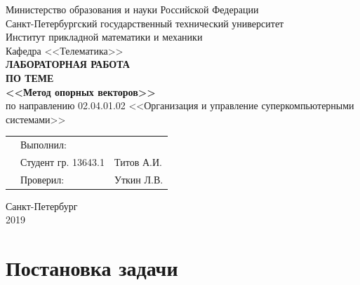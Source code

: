 \documentclass[]{article}
\numberwithin{equation}{section}
\begin{document}
    \thispagestyle{empty}
	\begin{center}
		Министерство образования и науки Российской Федерации\\
		Санкт-Петербургский государственный технический университет\\
		Институт прикладной математики и механики\\
		Кафедра <<Телематика>>\\
		\vspace{5cm}
		\textbf{\textbf{ЛАБОРАТОРНАЯ РАБОТА}}\\
        \vspace{0.5cm}
        \textbf{ПО ТЕМЕ}\\
        \vspace{0.5cm}
		\textbf{\textbf{<<Метод опорных векторов>>}}\\
		\vspace{3cm}
		по направлению 02.04.01.02 <<Организация и управление суперкомпьютерными системами>>
	\end{center}
	\vspace{2cm}
	\begin{tabular} {l l l}
	\hspace{9.5cm} & Выполнил: & \\
	& Студент гр. 13643.1 & Титов А.И.\\
	& Проверил: & Уткин Л.В.
	\end{tabular}
	\vspace{4.5cm}
	\begin{center}
		Санкт-Петербург\\
		2019
    \end{center}


	\renewcommand\contentsname{Оглавление}
	\tableofcontents

    \newpage
    \section*{Постановка задачи}
\end{document}
